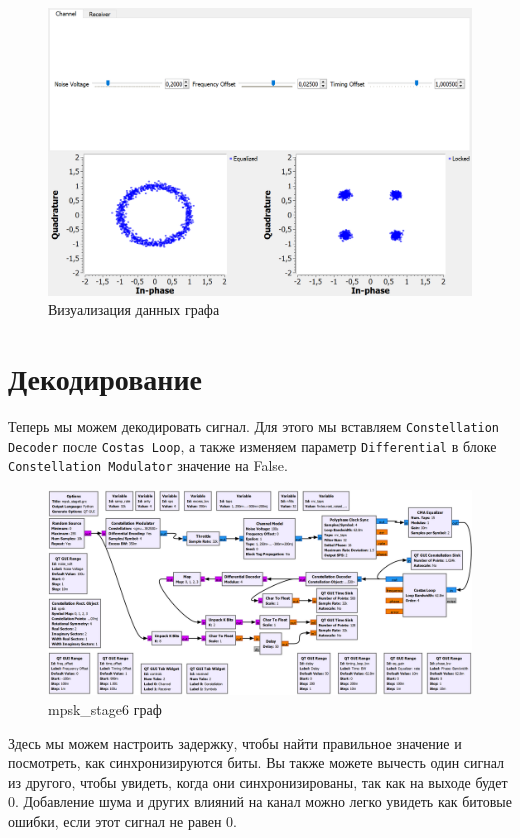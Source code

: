 \documentclass[a4paper,12pt]{report}
\begin{document}
\begin{figure}[H]
        \centering
        \includegraphics[width=1.0\textwidth]{lab12_fig6_2.png}
        \caption{Визуализация данных графа}
        \label{fig:lab12_fig6_2}
\end{figure}

\chapter{Декодирование}

Теперь мы можем декодировать сигнал. Для этого мы вставляем \texttt{Constellation Decoder} после \texttt{Costas Loop}, а также изменяем параметр \texttt{Differential} в блоке \texttt{Constellation Modulator} значение на False.

\begin{figure}[H]
        \centering
        \includegraphics[width=1.0\textwidth]{lab12_fig7_1.png}
        \caption{mpsk\_stage6 граф}
        \label{fig:lab12_fig7_1}
\end{figure}

 Здесь мы можем настроить задержку, чтобы найти правильное значение и посмотреть, как синхронизируются биты. Вы также можете вычесть один сигнал из другого, чтобы увидеть, когда они синхронизированы, так как на выходе будет 0. Добавление шума и других влияний на канал можно легко увидеть как битовые ошибки, если этот сигнал не равен 0.
 
\end{document}

